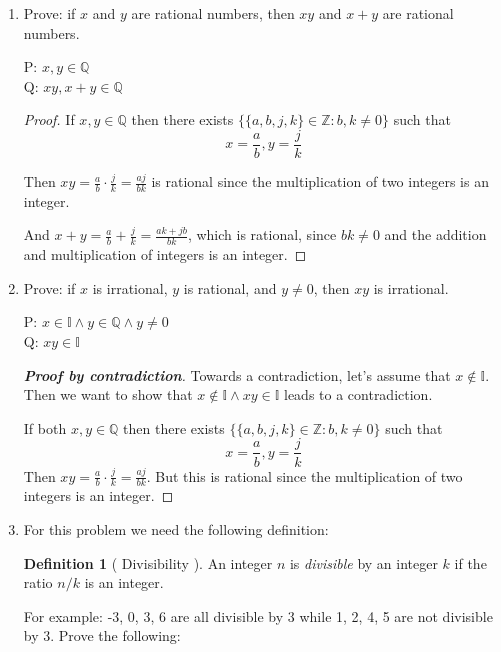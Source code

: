 \documentclass{article} %
\theoremstyle{plain}
\newtheorem*{theorem*}{Theorem}
\theoremstyle{definition}
\newtheorem*{definition*}{Definition}
\theoremstyle{case}
\begin{document}
\begin{enumerate}[label={\fbox{\textbf{Exercise \#\arabic* :}}}]
\begin{theorem*}
 \end{theorem*}

P: 
Q:

\begin{proof}
\end{proof} 

\newpage
\item Prove: if $x$ and $y$ are rational numbers, then $xy$ and $x+y$ are rational numbers. 

P: $x, y \in \mathbb{Q}$\\
Q: $xy, x+y \in \mathbb{Q}$

\begin{proof}

  If $x, y \in \mathbb{Q} $ then there exists $\{ \{a,b,j,k\} \in \mathbb{Z}: b,k \neq 0 \}$
such that 
  \[x = \frac{a}{b}, y = \frac{j}{k} \]

  Then $xy = \frac{a}{b} \cdot \frac{j}{k} = \frac{aj}{bk} $ is rational
  since the multiplication of two integers is an integer.

  And $x+y = \frac{a}{b} + \frac{j}{k} = \frac{ak + jb}{bk} $, which is
  rational, since $bk \neq 0$ and the addition and multiplication 
  of integers is an integer.
\end{proof} 

\newpage
\item Prove: if $x$ is irrational, $y$ is rational, and $y \neq 0$, then $xy$ is irrational. 


P: $x \in \mathbb{I} \wedge y \in \mathbb{Q} \wedge y \neq 0$ \\
Q: $xy \in \mathbb{I}$

\renewcommand\qedsymbol{\Lightning}
\begin{proof}[\textbf{Proof by contradiction}]  Towards a contradiction,
  let's assume that $x \notin \mathbb{I}$.  Then we want to show that
  $x \notin \mathbb{I} \wedge xy \in \mathbb{I}$ leads to a
  contradiction.

  If both $x,y \in \mathbb{Q} $ then there exists $\{ \{a,b,j,k\} \in \mathbb{Z}: b,k \neq 0 \}$ such that
    \[x = \frac{a}{b}, y = \frac{j}{k} \]
  Then $xy = \frac{a}{b} \cdot \frac{j}{k} = \frac{aj}{bk} $.  But this
  is rational since the multiplication of two integers is an integer.
\end{proof} 
\renewcommand\qedsymbol{$\square$}

\newpage
\item For this problem we need the following definition: 
  \begin{definition*}[ Divisibility ]
    An integer $n$ is \emph{divisible} by an integer $k$ if the ratio $n/k$ is an integer. 
  \end{definition*}
  For example: -3, 0, 3, 6 are all divisible by 3 while 1, 2, 4, 5 are not divisible by 3.  Prove the following: 


\end{enumerate}
\end{document}
